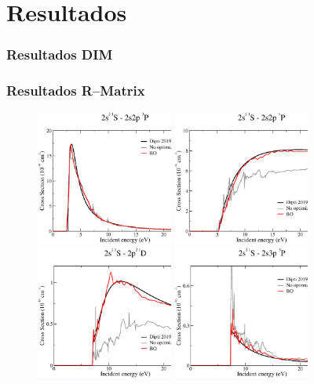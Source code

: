 \documentclass[14pt,compress]{beamer}
\begin{document}
\section{Resultados}
\begin{frame}
\frametitle{Resultados DIM}

\end{frame}
\begin{frame}
\frametitle{Resultados R--Matrix}

\vspace{-0.2cm}
\begin{figure}
\includegraphics[width=0.4\textwidth]{figures/rmatrix/sig001-002.eps}
\includegraphics[width=0.4\textwidth]{figures/rmatrix/sig001-003.eps} \\
\vspace{0.2cm}
\includegraphics[width=0.4\textwidth]{figures/rmatrix/sig001-006.eps} 
\includegraphics[width=0.4\textwidth]{figures/rmatrix/sig001-007.eps}
\end{figure}

\end{frame}
\end{document}
